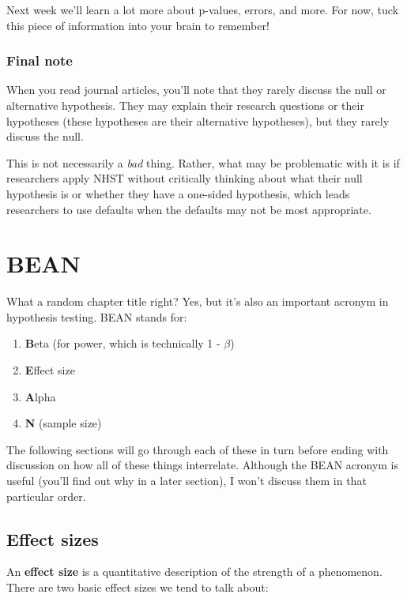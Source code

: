 \documentclass[
]{book}
\providecommand{\tightlist}{%
  \setlength{\itemsep}{0pt}\setlength{\parskip}{0pt}}
\begin{document}
Next week we'll learn a lot more about p-values, errors, and more. For now, tuck this piece of information into your brain to remember!

\hypertarget{final-note}{%
\subsection{Final note}\label{final-note}}

When you read journal articles, you'll note that they rarely discuss the null or alternative hypothesis. They may explain their research questions or their hypotheses (these hypotheses are their alternative hypotheses), but they rarely discuss the null.

This is not necessarily a \emph{bad} thing. Rather, what may be problematic with it is if researchers apply NHST without critically thinking about what their null hypothesis is or whether they have a one-sided hypothesis, which leads researchers to use defaults when the defaults may not be most appropriate.

\hypertarget{bean}{%
\chapter{BEAN}\label{bean}}

What a random chapter title right? Yes, but it's also an important acronym in hypothesis testing. BEAN stands for:

\begin{enumerate}
\def\labelenumi{\arabic{enumi}.}
\tightlist
\item
  \textbf{B}eta (for power, which is technically 1 - \(\beta\))
\item
  \textbf{E}ffect size
\item
  \textbf{A}lpha
\item
  \textbf{N} (sample size)
\end{enumerate}

The following sections will go through each of these in turn before ending with discussion on how all of these things interrelate. Although the BEAN acronym is useful (you'll find out why in a later section), I won't discuss them in that particular order.

\hypertarget{effect-sizes}{%
\section{Effect sizes}\label{effect-sizes}}

An \textbf{effect size} is a quantitative description of the strength of a phenomenon. There are two basic effect sizes we tend to talk about:
\end{document}
